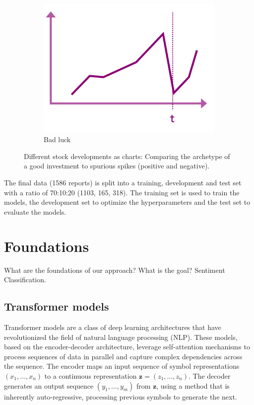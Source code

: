 \documentclass[conference]{IEEEtran}
\begin{document}
\begin{figure}[h!]
\begin{subfigure}{.33\linewidth}
        \centering
        \includegraphics[width=\linewidth]{../5. report/pictures/preproccessing3.png}
        \caption{Bad luck}
        \label{fig:preprocessing3}
    \end{subfigure}
    \caption{Different stock developments as charts: Comparing the archetype of a good investment to spurious spikes (positive and negative). }
    \label{fig:preprocessing}
\end{figure}

The final data (1586 reports) is split into a training, development and test set with a ratio of 70:10:20 (1103, 165, 318). The training set is used to train the models, the development set to optimize the hyperparameters and the test set to evaluate the models.
\section{Foundations} %
What are the foundations of our approach? What is the goal? Sentiment Classification.

\subsection{Transformer models}%
Transformer models are a class of deep learning architectures that have revolutionized the field of natural language processing (NLP). These models, based on the encoder-decoder architecture, leverage self-attention mechanisms to process sequences of data in parallel and capture complex dependencies across the sequence. The encoder maps an input sequence of symbol representations $(x_1, \ldots, x_n)$ to a continuous representation $\mathbf{z}=(z_1, \ldots, z_n)$. The decoder generates an output sequence $(y_1, \ldots, y_m)$ from $\mathbf{z}$, using a method that is inherently auto-regressive, processing previous symbols to generate the next.
\end{document}
